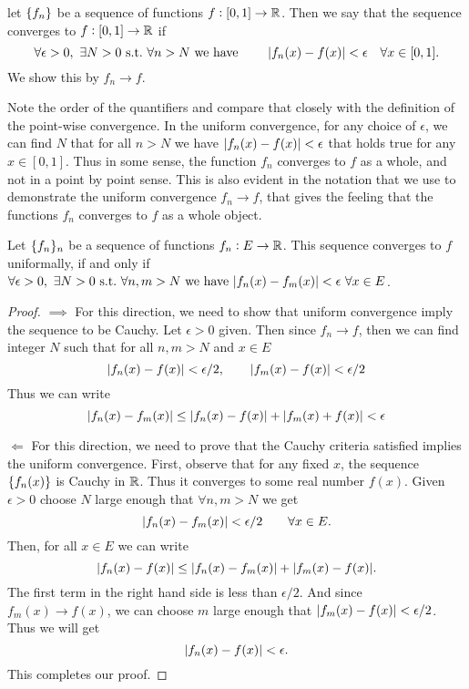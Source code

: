 \begin{definition}
	let $\{f_n\}$ be a sequence of functions $f:[0,1] \to \mathbb{R}$. Then we say that the sequence converges to $f: [0,1] \to \mathbb{R}$ if 
	\[ \forall \epsilon>0,\ \exists N>0 \st \forall n>N \wh \qquad \abs{f_n(x)-f(x)} < \epsilon \quad \forall x\in [0,1]. \]
	We show this by $f_n \to f$.
\end{definition}
\begin{remark}
	Note the order of the quantifiers and compare that closely with the definition of the point-wise convergence. In the uniform convergence, for any choice of $\epsilon$, we can find $N$ that for all $n>N$ we have $|f_n(x)- f(x)| <\epsilon$ that holds true for any $x\in [0,1]$. Thus in some sense, the function $f_n$ converges to $f$ as a whole, and not in a point by point sense. This is also evident in the notation that we use to demonstrate the uniform convergence $f_n \to f$, that gives the feeling that the functions $f_n$ converges to $f$ as a whole object.
\end{remark}

\begin{theorem}
	\label{thm:cauchyConv}
	Let $\{f_n\}_n$ be a sequence of functions $f_n: E \to \mathbb{R}$. This sequence converges to $f$ uniformally, if and only if $\forall \epsilon>0,\ \exists N>0 \ \text{s.t.}\  \forall n,m>N \ \text{we have}\  |f_n(x) - f_m(x)| < \epsilon \ \forall x\in E$.
\end{theorem}
\begin{proof}
	$\boxed{\implies}$ For this direction, we need to show that uniform convergence imply the sequence to be Cauchy. Let $\epsilon>0$ given. Then since $f_n \to f$, then we can find integer $N$ such that for all $n,m>N$ and $x\in E$
	\[ |f_n(x)-f(x)|<\epsilon/2, \qquad |f_m(x)-f(x)|<\epsilon/2 \]
	Thus we can write
	\[ |f_n(x) - f_m(x)| \leq |f_n(x)-f(x)| + |f_m(x)+f(x)| < \epsilon \]
	
	\noindent $\boxed{\Longleftarrow}$ For this direction, we need to prove that the Cauchy criteria satisfied implies the uniform convergence. First, observe that for any fixed $x$, the sequence $\{f_n(x)\}$ is Cauchy in $\mathbb{R}$. Thus it converges to some real number $f(x)$. Given $\epsilon>0$ choose $N$ large enough that $\forall n,m > N$ we get
	\[ |f_n(x) - f_m(x)|  < \epsilon/2 \qquad \forall x\in E.\]
	Then, for all $x\in E$ we can write
	\[ |f_n(x) - f(x)| \leq |f_n(x) - f_m(x)| + |f_m(x) - f(x)|. \]
	The first term in the right hand side is less than $\epsilon/2$. And since $f_m(x) \to f(x)$, we can choose $m$ large enough that $|f_m(x) - f(x)| < \epsilon/2$. Thus we will get
	\[ |f_n(x) - f(x)| < \epsilon. \]
	This completes our proof. 
\end{proof}

